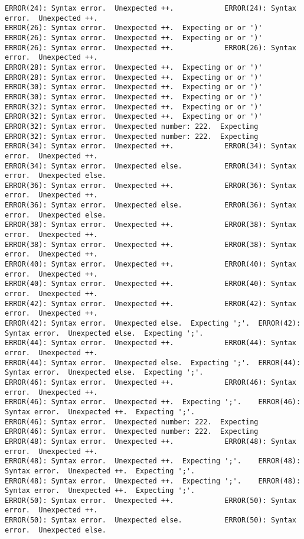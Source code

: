 \documentclass[12pt]{book}
\begin{document}
\begin{lstlisting}
ERROR(24): Syntax error.  Unexpected ++.			ERROR(24): Syntax error.  Unexpected ++.
ERROR(26): Syntax error.  Unexpected ++.  Expecting or or ')'	ERROR(26): Syntax error.  Unexpected ++.  Expecting or or ')'
ERROR(26): Syntax error.  Unexpected ++.			ERROR(26): Syntax error.  Unexpected ++.
ERROR(28): Syntax error.  Unexpected ++.  Expecting or or ')'	ERROR(28): Syntax error.  Unexpected ++.  Expecting or or ')'
ERROR(30): Syntax error.  Unexpected ++.  Expecting or or ')'	ERROR(30): Syntax error.  Unexpected ++.  Expecting or or ')'
ERROR(32): Syntax error.  Unexpected ++.  Expecting or or ')'	ERROR(32): Syntax error.  Unexpected ++.  Expecting or or ')'
ERROR(32): Syntax error.  Unexpected number: 222.  Expecting 	ERROR(32): Syntax error.  Unexpected number: 222.  Expecting 
ERROR(34): Syntax error.  Unexpected ++.			ERROR(34): Syntax error.  Unexpected ++.
ERROR(34): Syntax error.  Unexpected else.			ERROR(34): Syntax error.  Unexpected else.
ERROR(36): Syntax error.  Unexpected ++.			ERROR(36): Syntax error.  Unexpected ++.
ERROR(36): Syntax error.  Unexpected else.			ERROR(36): Syntax error.  Unexpected else.
ERROR(38): Syntax error.  Unexpected ++.			ERROR(38): Syntax error.  Unexpected ++.
ERROR(38): Syntax error.  Unexpected ++.			ERROR(38): Syntax error.  Unexpected ++.
ERROR(40): Syntax error.  Unexpected ++.			ERROR(40): Syntax error.  Unexpected ++.
ERROR(40): Syntax error.  Unexpected ++.			ERROR(40): Syntax error.  Unexpected ++.
ERROR(42): Syntax error.  Unexpected ++.			ERROR(42): Syntax error.  Unexpected ++.
ERROR(42): Syntax error.  Unexpected else.  Expecting ';'.	ERROR(42): Syntax error.  Unexpected else.  Expecting ';'.
ERROR(44): Syntax error.  Unexpected ++.			ERROR(44): Syntax error.  Unexpected ++.
ERROR(44): Syntax error.  Unexpected else.  Expecting ';'.	ERROR(44): Syntax error.  Unexpected else.  Expecting ';'.
ERROR(46): Syntax error.  Unexpected ++.			ERROR(46): Syntax error.  Unexpected ++.
ERROR(46): Syntax error.  Unexpected ++.  Expecting ';'.	ERROR(46): Syntax error.  Unexpected ++.  Expecting ';'.
ERROR(46): Syntax error.  Unexpected number: 222.  Expecting 	ERROR(46): Syntax error.  Unexpected number: 222.  Expecting 
ERROR(48): Syntax error.  Unexpected ++.			ERROR(48): Syntax error.  Unexpected ++.
ERROR(48): Syntax error.  Unexpected ++.  Expecting ';'.	ERROR(48): Syntax error.  Unexpected ++.  Expecting ';'.
ERROR(48): Syntax error.  Unexpected ++.  Expecting ';'.	ERROR(48): Syntax error.  Unexpected ++.  Expecting ';'.
ERROR(50): Syntax error.  Unexpected ++.			ERROR(50): Syntax error.  Unexpected ++.
ERROR(50): Syntax error.  Unexpected else.			ERROR(50): Syntax error.  Unexpected else.

\end{lstlisting}
\end{document}
